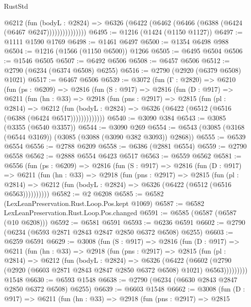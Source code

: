 \begin{lexlean}{RustStd}
\begin{coremodule}
                  @6212
                    (fun (bodyL : @2824) =>
                    @6326 (@6422 (@6462 (@6466 (@6388 (@6424 (@6467 @6247)))))))))))))))
@6495 := @1216 (@1424 (@1150 @1127))
@6497 := @1111 @1590 @1769
@6498 := @1461 @6497
@6500 := @1354 @6498 @988
@6504 := @1216 (@1566 (@1150 @6500)) @1266
@6505 := @6495 @6504
@6506 := @1546 @6505
@6507 := @6492 @6506
@6508 := @6457 @6506
@6512 := @2790 (@6234 (@6374 @6508) @6255)
@6516 := @2790 (@2920 (@6379 @6508) @1021)
@6517 := @6467 @6506
@6539 := @3072
    (fun (Γ : @2820) =>
    @6210
      (fun (ps : @6209) =>
      @2816
        (fun (S : @917) =>
        @2816
          (fun (D : @917) =>
          @6211
            (fun (hn : @33) =>
            @2918
              (fun (pns : @2917) =>
              @2815
                (fun (pl : @2814) =>
                @6212
                  (fun (bodyL : @2824) =>
                  @6326 (@6422 (@6512 (@6516 (@6388 (@6424 @6517)))))))))))))
@6540 := @3090 @384
@6543 := @3085 (@3355 (@6540 @3357))
@6544 := @3090 @269
@6554 := @6543 (@3085 (@3168 (@6544 @3169)) (@3085 (@3088 (@3090 @382 @3093)) @2868))
@6555 := @6539 @6554
@6556 := @2788 @6209
@6558 := @6386 (@2881 @6554)
@6559 := @2790 @6558
@6562 := @2888 @6554 @6423 @6517
@6563 := @6559 @6562
@6581 := @6556
    (fun (ps : @6209) =>
    @2816
      (fun (S : @917) =>
      @2816
        (fun (D : @917) =>
        @6211
          (fun (hn : @33) =>
          @2918
            (fun (pns : @2917) =>
            @2815
              (fun (pl : @2814) =>
              @6212 (fun (bodyL : @2824) => @6326 (@6422 (@6512 (@6516 @6563))))))))))
@6582 := @2 @6208
@6585 := @6582 (LexLeanPreservation.Rust.Loop.Pos.kept @1069)
@6587 := @6582 LexLeanPreservation.Rust.Loop.Pos.changed
@6591 := @6585 (@6587 (@6587 (@10 @6208)))
@6592 := @6581 @6591
@6593 := @6236 @6591
@6602 := @2790 (@6234 (@6593 @2871 @2843 @2847 @2850 @6372 @6508) @6255)
@6603 := @6259 @6591
@6629 := @3008
    (fun (S : @917) =>
    @2816
      (fun (D : @917) =>
      @6211
        (fun (hn : @33) =>
        @2918
          (fun (pns : @2917) =>
          @2815
            (fun (pl : @2814) =>
            @6212
              (fun (bodyL : @2824) =>
              @6326
                (@6422
                  (@6602
                    (@2790 (@2920 (@6603 @2871 @2843 @2847 @2850 @6372 @6508) @1021) @6563)))))))))
    @1548
@6630 := @6593 @1548
@6638 := @2790 (@6234 (@6630 @2843 @2847 @2850 @6372 @6508) @6255)
@6639 := @6603 @1548
@6662 := @3008
    (fun (D : @917) =>
    @6211
      (fun (hn : @33) =>
      @2918
        (fun (pns : @2917) =>
        @2815

\end{coremodule}
\end{lexlean}
